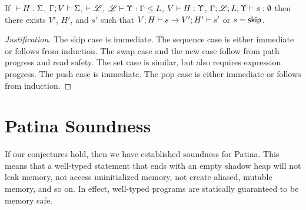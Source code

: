 \begin{conj}
  If ${} \vdash {H} : {\Sigma}$, $\Gamma;V\vdash\Sigma$, $\vdash\mathscr{L}$, ${\mathscr{L}} \vdash {\Upsilon} : {\Gamma} \leq {L}$,
  ${V} \vdash {H} : {\Upsilon}$, ${\Gamma;\mathscr{L};L;\Upsilon} \vdash {s} : {\emptyset}$
  then there exists $V'$, $H'$, and $s'$ such that ${V};{H}\vdash{s}\to{V'};{H'}\vdash{s'}$
  or $s = \mathsf{skip}$.
\end{conj}

\begin{proof}[Justification]
  The skip case is immediate.
  The sequence case is either immediate or follows from induction.
  The swap case and the new case follow from path progress and read safety.
  The set case is similar, but also requires expression progress.
  The push case is immediate.
  The pop case is either immediate or follows from induction.
\end{proof}

\section*{Patina Soundness}
If our conjectures hold, then we have established soundness for Patina.
This means that a well-typed statement that ends with an empty shadow heap
will not leak memory, not access uninitialized memory, not create aliased, mutable memory,
and so on. In effect, well-typed programs are statically guaranteed to be memory safe.
